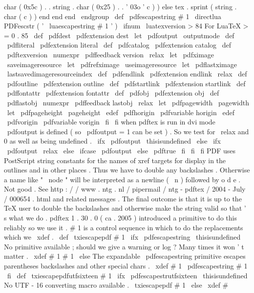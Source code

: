 {{char
(
0x5c
)
.
.
string
.
char
(
0x25
)
.
.
'
03o
'
c
)
)
else
tex
.
sprint
(
string
.
char
(
c
)
)
end
end
end
}
\
endgroup
\
def
\
pdfescapestring
#
1
{
\
directlua
{
PDFescstr
(
'
\
luaescapestring
{
#
1
}
'
)
}
}
\
ifnum
\
luatexversion
>
84
%
For
LuaTeX
>
=
0
.
85
\
def
\
pdfdest
{
\
pdfextension
dest
}
\
let
\
pdfoutput
\
outputmode
\
def
\
pdfliteral
{
\
pdfextension
literal
}
\
def
\
pdfcatalog
{
\
pdfextension
catalog
}
\
def
\
pdftexversion
{
\
numexpr
\
pdffeedback
version
\
relax
}
\
let
\
pdfximage
\
saveimageresource
\
let
\
pdfrefximage
\
useimageresource
\
let
\
pdflastximage
\
lastsavedimageresourceindex
\
def
\
pdfendlink
{
\
pdfextension
endlink
\
relax
}
\
def
\
pdfoutline
{
\
pdfextension
outline
}
\
def
\
pdfstartlink
{
\
pdfextension
startlink
}
\
def
\
pdffontattr
{
\
pdfextension
fontattr
}
\
def
\
pdfobj
{
\
pdfextension
obj
}
\
def
\
pdflastobj
{
\
numexpr
\
pdffeedback
lastobj
\
relax
}
\
let
\
pdfpagewidth
\
pagewidth
\
let
\
pdfpageheight
\
pageheight
\
edef
\
pdfhorigin
{
\
pdfvariable
horigin
}
\
edef
\
pdfvorigin
{
\
pdfvariable
vorigin
}
\
fi
\
fi
%
when
pdftex
is
run
in
dvi
mode
\
pdfoutput
is
defined
(
so
\
pdfoutput
=
1
%
can
be
set
)
.
So
we
test
for
\
relax
and
0
as
well
as
being
undefined
.
\
ifx
\
pdfoutput
\
thisisundefined
\
else
\
ifx
\
pdfoutput
\
relax
\
else
\
ifcase
\
pdfoutput
\
else
\
pdftrue
\
fi
\
fi
\
fi
%
PDF
uses
PostScript
string
constants
for
the
names
of
xref
targets
%
for
display
in
the
outlines
and
in
other
places
.
Thus
we
have
to
%
double
any
backslashes
.
Otherwise
a
name
like
"
\
node
"
will
be
%
interpreted
as
a
newline
(
\
n
)
followed
by
o
d
e
.
Not
good
.
%
%
See
http
:
/
/
www
.
ntg
.
nl
/
pipermail
/
ntg
-
pdftex
/
2004
-
July
/
000654
.
html
and
%
related
messages
.
The
final
outcome
is
that
it
is
up
to
the
TeX
user
%
to
double
the
backslashes
and
otherwise
make
the
string
valid
so
%
that
'
s
what
we
do
.
pdftex
1
.
30
.
0
(
ca
.
2005
)
introduced
a
primitive
to
%
do
this
reliably
so
we
use
it
.
%
#
1
is
a
control
sequence
in
which
to
do
the
replacements
%
which
we
\
xdef
.
\
def
\
txiescapepdf
#
1
{
%
\
ifx
\
pdfescapestring
\
thisisundefined
%
No
primitive
available
;
should
we
give
a
warning
or
log
?
%
Many
times
it
won
'
t
matter
.
\
xdef
#
1
{
#
1
}
%
\
else
%
The
expandable
\
pdfescapestring
primitive
escapes
parentheses
%
backslashes
and
other
special
chars
.
\
xdef
#
1
{
\
pdfescapestring
{
#
1
}
}
%
\
fi
}
\
def
\
txiescapepdfutfsixteen
#
1
{
%
\
ifx
\
pdfescapestrutfsixteen
\
thisisundefined
%
No
UTF
-
16
converting
macro
available
.
\
txiescapepdf
{
#
1
}
%
\
else
\
xdef
#
}}
